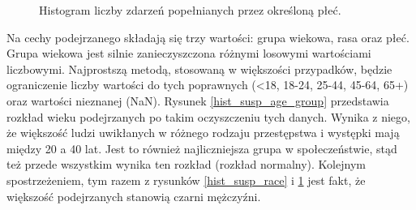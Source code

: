 \documentclass{classrep}
\begin{document}
{{{\begin{figure}[!htbp]
                    \caption{Histogram liczby zdarzeń popełnianych przez określoną płeć.}
                    \label{hist_susp_sex}
                \end{figure}
                \FloatBarrier
                Na cechy podejrzanego składają się trzy wartości: grupa wiekowa, rasa
                oraz płeć. Grupa wiekowa jest silnie zanieczyszczona różnymi losowymi
                wartościami liczbowymi. Najprostszą metodą, stosowaną w większości
                przypadków, będzie ograniczenie liczby wartości do tych poprawnych
                (<18, 18-24, 25-44, 45-64, 65+) oraz wartości nieznanej (NaN). Rysunek
                \ref{hist_susp_age_group} przedstawia rozkład wieku podejrzanych po
                takim oczyszczeniu tych danych. Wynika z niego, że większość ludzi
                uwikłanych w różnego rodzaju przestępstwa i występki mają między 20 a
                40 lat. Jest to również najliczniejsza grupa w społeczeństwie, stąd też
                przede wszystkim wynika ten rozkład (rozkład normalny). Kolejnym
                spostrzeżeniem, tym razem z rysunków \ref{hist_susp_race} i
                \ref{hist_susp_sex} jest fakt, że większość podejrzanych stanowią
                czarni mężczyźni.
            }

}}
\end{document}
